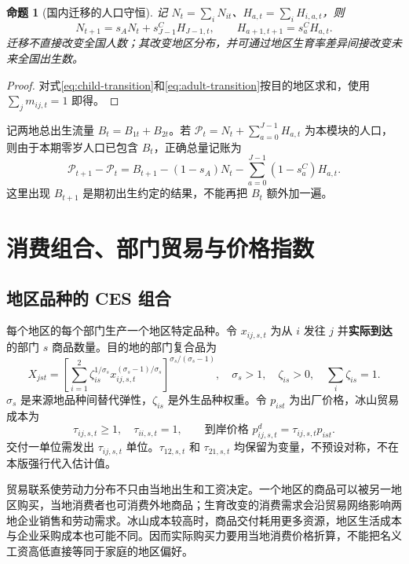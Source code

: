 \documentclass[UTF8,a4paper,zihao=-4,fontset=windows]{ctexart}
\numberwithin{equation}{section}
\newtheorem{proposition}{命题}[section]
\begin{document}
\begin{proposition}[国内迁移的人口守恒]
记 $N_t=\sum_iN_{it}$、$H_{a,t}=\sum_iH_{i,a,t}$，则
\begin{equation}
 N_{t+1}=s_AN_t+s^C_{J-1}H_{J-1,t},\qquad
 H_{a+1,t+1}=s^C_aH_{a,t}.
 \label{eq:national-pop}
\end{equation}
迁移不直接改变全国人数；其改变地区分布，并可通过地区生育率差异间接改变未来全国出生数。
\end{proposition}
\begin{proof}
对式\eqref{eq:child-transition}和\eqref{eq:adult-transition}按目的地区求和，使用 $\sum_jm_{ij,t}=1$ 即得。
\end{proof}
记两地总出生流量 $B_t=B_{1t}+B_{2t}$。若 $\mathcal P_t=N_t+\sum_{a=0}^{J-1}H_{a,t}$ 为本模块的人口，则由于本期零岁人口已包含 $B_t$，正确总量记账为
\begin{equation}
 \mathcal P_{t+1}-\mathcal P_t
 =B_{t+1}-(1-s_A)N_t-\sum_{a=0}^{J-1}(1-s^C_a)H_{a,t}.
 \label{eq:population-account}
\end{equation}
这里出现 $B_{t+1}$ 是期初出生约定的结果，不能再把 $B_t$ 额外加一遍。

\section{消费组合、部门贸易与价格指数}
\label{sec:trade}

\subsection{地区品种的 CES 组合}
每个地区的每个部门生产一个地区特定品种。令 $x_{ij,s,t}$ 为从 $i$ 发往 $j$ 并\textbf{实际到达}的部门 $s$ 商品数量。目的地的部门复合品为
\begin{equation}
 X_{jst}=\left[\sum_{i=1}^2\zeta_{is}^{1/\sigma_s}
 x_{ij,s,t}^{(\sigma_s-1)/\sigma_s}\right]^{\sigma_s/(\sigma_s-1)},
 \quad \sigma_s>1,\quad \zeta_{is}>0,\quad \sum_i\zeta_{is}=1.
 \label{eq:armington}
\end{equation}
$\sigma_s$ 是来源地品种间替代弹性，$\zeta_{is}$ 是外生品种权重。令 $p_{ist}$ 为出厂价格，冰山贸易成本为
\begin{equation}
 \tau_{ij,s,t}\geq1,\quad \tau_{ii,s,t}=1,\qquad
 \text{到岸价格 }p^d_{ij,s,t}=\tau_{ij,s,t}p_{ist}.
 \label{eq:trade-cost}
\end{equation}
交付一单位需发出 $\tau_{ij,s,t}$ 单位。$\tau_{12,s,t}$ 和 $\tau_{21,s,t}$ 均保留为变量，不预设对称，不在本版强行代入估计值。

贸易联系使劳动力分布不只由当地出生和工资决定。一个地区的商品可以被另一地区购买，当地消费者也可消费外地商品；生育改变的消费需求会沿贸易网络影响两地企业销售和劳动需求。冰山成本较高时，商品交付耗用更多资源，地区生活成本与企业采购成本也可能不同。因而实际购买力要用当地消费价格折算，不能把名义工资高低直接等同于家庭的地区偏好。
\end{document}
